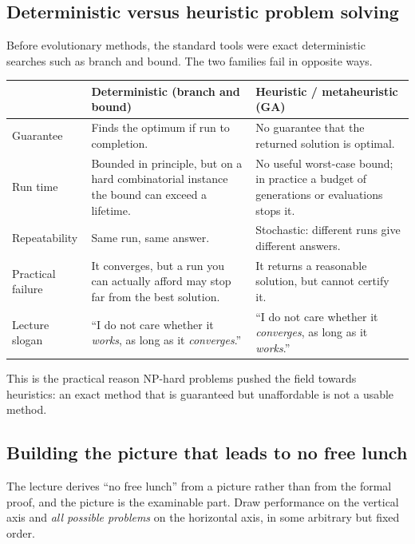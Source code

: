 \documentclass[11pt,a4paper]{article}
\begin{document}
\subsection{Deterministic versus heuristic problem solving}
Before evolutionary methods, the standard tools were exact deterministic
searches such as branch and bound. The two families fail in opposite ways.

\begin{tabular}{@{}>{\raggedright\arraybackslash}p{}
  >{\raggedright\arraybackslash}p{}
  >{\raggedright\arraybackslash}p{}@{}}
\toprule
& \textbf{Deterministic (branch and bound)} & \textbf{Heuristic / metaheuristic (GA)}\\
\midrule
Guarantee & Finds the optimum if run to completion. & No guarantee that the returned solution is optimal.\\
Run time & Bounded in principle, but on a hard combinatorial instance the bound can exceed a lifetime. & No useful worst-case bound; in practice a budget of generations or evaluations stops it.\\
Repeatability & Same run, same answer. & Stochastic: different runs give differ\-ent answers.\\
Practical failure & It converges, but a run you can actually afford may stop far from the best solution. & It returns a reasonable solution, but cannot certify it.\\
Lecture slogan & ``I do not care whether it \emph{works}, as long as it \emph{converges}.'' & ``I do not care whether it \emph{converges}, as long as it \emph{works}.''\\
\bottomrule
\end{tabular}

\medskip
This is the practical reason NP-hard problems pushed the field towards
heuristics: an exact method that is guaranteed but unaffordable is not a
usable method.

\subsection{Building the picture that leads to no free lunch}
The lecture derives ``no free lunch'' from a picture rather than from the
formal proof, and the picture is the examinable part. Draw performance on the
vertical axis and \emph{all possible problems} on the horizontal axis, in some
arbitrary but fixed order.
\end{document}
